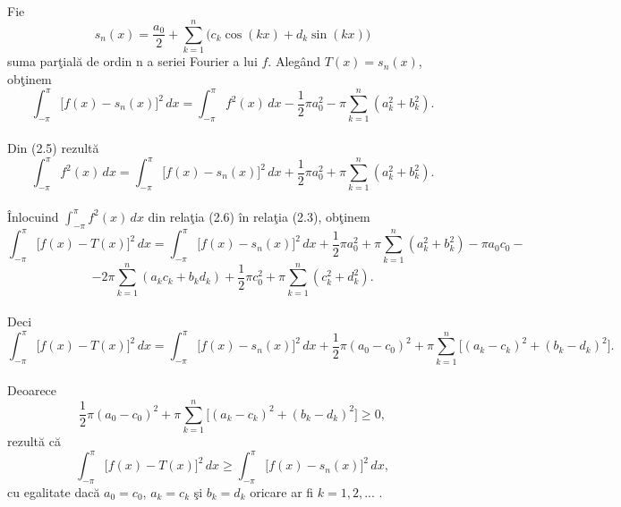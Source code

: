 \documentclass[a4paper,openany,12pt]{report}
\begin{document}
\paragraph*{}Fie 
\begin{equation}
s_n(x) = \frac{a_0}{2} + \sum_{k=1}^n \Big(c_k\cos(kx) + d_k\sin(kx)\Big)
\end{equation}
suma par\c tial\u a de ordin n a seriei Fourier a lui $f$. Aleg\^ and $T(x) = s_n(x)$, ob\c tinem
\begin{equation}
\int_{-\pi}^{\pi} \Big[f(x) - s_n(x)\Big]^2\,dx = \int_{-\pi}^{\pi} f^2(x)\,dx - \frac{1}{2}\pi a_0^2 - \pi \sum_{k=1}^{n}(a_k^2 + b_k^2).
\end{equation}
\paragraph*{}Din (2.5) rezult\u a
\begin{equation}
\int_{-\pi}^{\pi} f^2(x)\,dx = \int_{-\pi}^{\pi} \Big[f(x) - s_n(x)\Big]^2\,dx + \frac{1}{2}\pi a_0^2 + \pi \sum_{k=1}^{n}(a_k^2 + b_k^2).
\end{equation}
\paragraph*{}\^ Inlocuind $\int_{-\pi}^{\pi} f^2(x)\,dx$ din rela\c tia (2.6) \^ in rela\c tia (2.3), ob\c tinem
\begin{equation*}
\int_{-\pi}^{\pi} \Big[f(x) - T(x)\Big]^2\,dx = \int_{-\pi}^{\pi} \Big[f(x) - s_n(x)\Big]^2\,dx + \frac{1}{2}\pi a_0^2 + \pi \sum_{k=1}^{n}(a_k^2 + b_k^2) - \pi a_0 c_0 - 
\end{equation*}
 \begin{equation*}
 - 2\pi\sum_{k=1}^{n}(a_kc_k + b_kd_k) + \frac{1}{2}\pi c_0^2 + \pi\sum_{k=1}^{n}({c_k^2 + d_k^2}).
\end{equation*}
\paragraph*{}Deci
\begin{equation*}
 \int_{-\pi}^{\pi} \Big[f(x) - T(x)\Big]^2\,dx = \int_{-\pi}^{\pi} \Big[f(x) - s_n(x)\Big]^2\,dx + \frac{1}{2}\pi (a_0 - c_0)^2 + \pi\sum_{k=1}^{n}\Big[(a_k - c_k)^2 + (b_k - d_k)^2\Big].
\end{equation*}
\paragraph*{}Deoarece
\begin{equation*}
 \frac{1}{2}\pi (a_0 - c_0)^2 + \pi\sum_{k=1}^{n}\Big[(a_k - c_k)^2 + (b_k - d_k)^2\Big] \geq 0,
\end{equation*}
rezult\u a c\u a
\begin{equation}
 \int_{-\pi}^{\pi} \Big[f(x) - T(x)\Big]^2\,dx\geq \int_{-\pi}^{\pi} \Big[f(x) - s_n(x)\Big]^2\,dx,
\end{equation}
cu egalitate dac\u a $a_0 = c_0$, $a_k = c_k$ \c si $b_k = d_k$ oricare ar fi $k = 1, 2, ...$ .
\end{document}
